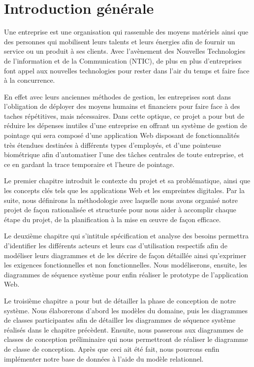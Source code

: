 \chapter*{Introduction générale}
\renewcommand{\headrulewidth}{1pt}
\onehalfspacing
\thispagestyle{empty}
    
Une entreprise est une organisation qui rassemble des moyens matériels ainsi que
des personnes qui mobilisent leurs talents et leurs énergies afin de fournir un
service ou un produit à ses clients. Avec l’avènement des Nouvelles Technologies
de l’information et de la Communication (NTIC), de plus en plus d’entreprises font
appel aux nouvelles technologies pour rester dans l’air du temps et faire face à
la concurrence.

En effet avec leurs anciennes méthodes de gestion, les entreprises sont dans
l’obligation de déployer des moyens humains et financiers pour faire face à des
taches répétitives, mais nécessaires. Dans cette optique, ce projet a pour but
de réduire les dépenses inutiles d’une entreprise en offrant un système de
gestion de pointage qui sera composé d’une application Web disposant de
fonctionnalités très étendues destinées à différents types d’employés, et d’une
pointeuse biométrique afin d’automatiser l’une des tâches centrales de toute
entreprise, et ce en gardant la trace temporaire et l’heure de pointage.

Le premier chapitre introduit le contexte du projet et sa problématique, ainsi
que les concepts clés tels que les applications Web et les empreintes digitales.
Par la suite, nous définirons la méthodologie avec laquelle nous avons organisé
notre projet de façon rationalisée et structurée pour nous aider à accomplir
chaque étape du projet, de la planification à la mise en œuvre de façon
efficace.

Le deuxième chapitre qui s’intitule spécification et analyse des besoins
permettra d’identifier les différents acteurs et leurs cas d’utilisation
respectifs afin de modéliser leurs diagrammes et de les décrire de façon
détaillée ainsi qu’exprimer les exigences fonctionnelles et non fonctionnelles.
Nous modéliserons, ensuite, les diagrammes de séquence système pour enfin
réaliser le prototype de l’application Web.

Le troisième chapitre a pour but de détailler la phase de conception de notre
système. Nous élaborerons d’abord les modèles du domaine, puis les diagrammes de
classes participantes afin de détailler les diagrammes de séquence système
réalisés dans le chapitre précèdent. Ensuite, nous passerons aux diagrammes de
classes de conception préliminaire qui nous permettront de réaliser le diagramme de
classe de conception. Après que ceci ait été fait, nous pourrons enfin
implémenter notre base de données à l’aide du modèle relationnel. 

